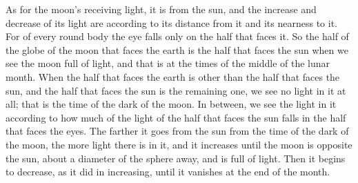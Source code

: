 \documentclass[11pt]{article}
\begin{document}
\par As for the moon's receiving light, it is from the sun, and the increase and decrease of its light are according to its distance from it and its nearness to it. For of every round body the eye falls only on the half that faces it. So the half of the globe of the moon that faces the earth is the half that faces the sun when we see the moon full of light, and that is at the times of the middle of the lunar month. When the half that faces the earth is other than the half that faces the sun, and the half that faces the sun is the remaining one, we see no light in it at all; that is the time of the dark of the moon. In between, we see the light in it according to how much of the light of the half that faces the sun falls in the half that faces the eyes. The farther it goes from the sun from the time of the dark of the moon, the more light there is in it, and it increases until the moon is opposite the sun, about a diameter of the sphere away, and is full of light. Then it begins to decrease, as it did in increasing, until it vanishes at the end of the month.\par
\end{document}
